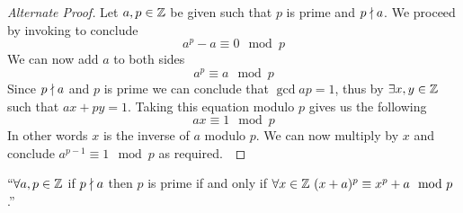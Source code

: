         \begin{proof}[Alternate Proof]
            Let $a, p \in \mathbb{Z}$ be given such that $p$ is prime and $p \nmid a$.
            We proceed by invoking  to conclude
            \[
                a^p - a \equiv 0 \mod p
            \]
            We can now add $a$ to both sides
            \begin{equation}
                a^p \equiv a \mod p
                \label{fermat equation}
            \end{equation}
            Since $p \nmid a$ and $p$ is prime we can conclude that $\gcd{a}{p} = 1$,
            thus by  $\exists x, y \in \mathbb{Z}$ such that
            $ax + py = 1$. Taking this equation modulo $p$ gives us the following
            \[
                ax \equiv 1 \mod p
            \]
            In other words $x$ is the inverse of $a$ modulo $p$. We can now multiply
             by $x$ and conclude $a^{p - 1} \equiv 1 \mod p$
            as required.~\QED
        \end{proof}
        \begin{theorem}
            $``\forall a, p \in \mathbb{Z}$ if $p \nmid a$ then
            $p$ is prime if and only if $\forall x \in \mathbb{Z} \ (x + a)^p \equiv x^p + a \mod p$.''
        \end{theorem}
